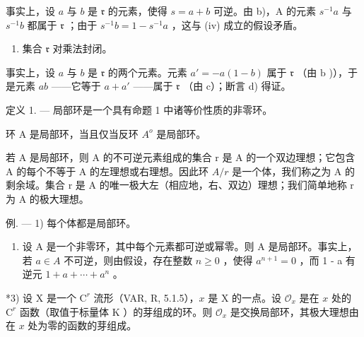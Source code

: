 事实上，设 \(a\) 与 \(b\) 是 \(\mathfrak{r}\) 的元素，使得 \(s = a + b\) 可逆。由 b)，A 的元素 \(s^{-1}a\) 与 \(s^{-1}b\) 都属于 \(\mathfrak{r}\) ；由于 \(s^{-1}b = 1 - s^{-1}a\) ，这与 (iv) 成立的假设矛盾。

\begin{enumerate}
\def\labelenumi{\alph{enumi})}
\setcounter{enumi}{3}
\tightlist
\item
  集合 \(\mathfrak{r}\) 对乘法封闭。
\end{enumerate}

事实上，设 \(a\) 与 \(b\) 是 \(\mathfrak{r}\) 的两个元素。元素 \(a' = -a(1 - b)\) 属于 \(\mathfrak{r}\) （由 \(\mathrm{b}\) )），于是元素 \(ab\) ——它等于 \(a + a'\) ——属于 \(\mathfrak{r}\) （由 \(\mathrm{c}\)）；断言 d) 得证。

定义 1. --- 局部环是一个具有命题 1 中诸等价性质的非零环。

环 A 是局部环，当且仅当反环 \(A^{o}\) 是局部环。

若 A 是局部环，则 A 的不可逆元素组成的集合 r 是 A 的一个双边理想；它包含 A 的每个不等于 A 的左理想或右理想。因此环 \(A/r\) 是一个体，我们称之为 A 的剩余域。集合 r 是 A 的唯一极大左（相应地，右、双边）理想；我们简单地称 r 为 A 的极大理想。

例. --- 1) 每个体都是局部环。

\begin{enumerate}
\def\labelenumi{\arabic{enumi})}
\setcounter{enumi}{1}
\tightlist
\item
  设 A 是一个非零环，其中每个元素都可逆或幂零。则 A 是局部环。事实上，若 \(a \in A\) 不可逆，则由假设，存在整数 \(n \geqslant 0\) ，使得 \(a^{n+1} = 0\) ，而 1 - a 有逆元 \(1 + a + \cdots + a^{n}\) 。
\end{enumerate}

*3) 设 \(\mathrm{X}\) 是一个 \(\mathrm{C}^r\) 流形（VAR, R, 5.1.5），\(x\) 是 \(\mathrm{X}\) 的一点。设 \(\mathcal{O}_x\) 是在 \(x\) 处的 \(\mathrm{C}^r\) 函数（取值于标量体 \(\mathrm{K}\) ）的芽组成的环。则 \(\mathcal{O}_x\) 是交换局部环，其极大理想由在 \(x\) 处为零的函数的芽组成。


